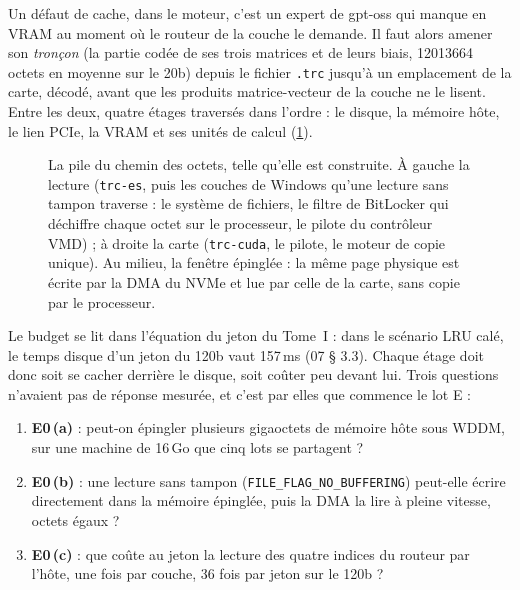 Un défaut de cache, dans le moteur, c'est un expert de gpt-oss qui manque en VRAM au moment où le routeur de la couche le demande. Il faut alors amener son \emph{tronçon} (la partie codée de ses trois matrices et de leurs biais, \num{12013664} octets en moyenne sur le 20b) depuis le fichier \texttt{.trc} jusqu'à un emplacement de la carte, décodé, avant que les produits matrice-vecteur de la couche ne le lisent. Entre les deux, quatre étages traversés dans l'ordre : le disque, la mémoire hôte, le lien PCIe, la VRAM et ses unités de calcul (\cref{fig:t2c-pile}).

\begin{figure}[ht]
\centering
\resizebox{\linewidth}{!}{\SchemaChmPile}
\caption[La pile du chemin des octets]{La pile du chemin des octets, telle qu'elle est construite. À gauche la lecture (\texttt{trc-es}, puis les couches de Windows qu'une lecture sans tampon traverse : le système de fichiers, le filtre de BitLocker qui déchiffre chaque octet sur le processeur, le pilote du contrôleur VMD) ; à droite la carte (\texttt{trc-cuda}, le pilote, le moteur de copie unique). Au milieu, la fenêtre épinglée : la même page physique est écrite par la DMA du NVMe et lue par celle de la carte, sans copie par le processeur.}
\label{fig:t2c-pile}
\end{figure}

Le budget se lit dans l'équation du jeton du Tome~I : dans le scénario LRU calé, le temps disque d'un jeton du 120b vaut 157\,ms (07 § 3.3). Chaque étage doit donc soit se cacher derrière le disque, soit coûter peu devant lui. Trois questions n'avaient pas de réponse mesurée, et c'est par elles que commence le lot E :
\begin{enumerate}
\item \textbf{E0\,(a)} : peut-on épingler plusieurs gigaoctets de mémoire hôte sous WDDM, sur une machine de 16\,Go que cinq lots se partagent ?
\item \textbf{E0\,(b)} : une lecture sans tampon (\texttt{FILE\_FLAG\_NO\_BUFFERING}) peut-elle écrire directement dans la mémoire épinglée, puis la DMA la lire à pleine vitesse, octets égaux ?
\item \textbf{E0\,(c)} : que coûte au jeton la lecture des quatre indices du routeur par l'hôte, une fois par couche, 36 fois par jeton sur le 120b ?
\end{enumerate}

